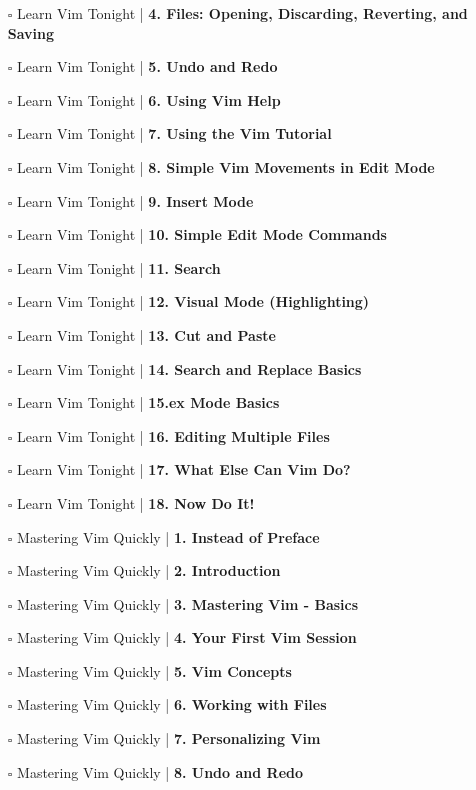 \documentclass[a4, landscape, 12pt]{article}
\newcommand{\checkbox}{$\square$}%
\begin{document}
\begin{itemize}
{}
\item [\checkbox]  Learn Vim Tonight | \textbf{ 4. Files: Opening, Discarding, Reverting, and Saving
}
\item [\checkbox]  Learn Vim Tonight | \textbf{ 5. Undo and Redo
}
\item [\checkbox]  Learn Vim Tonight | \textbf{ 6. Using Vim Help
}
\item [\checkbox]  Learn Vim Tonight | \textbf{ 7. Using the Vim Tutorial
}
\item [\checkbox]  Learn Vim Tonight | \textbf{ 8. Simple Vim Movements in Edit Mode
}
\item [\checkbox]  Learn Vim Tonight | \textbf{ 9. Insert Mode
}
\item [\checkbox]  Learn Vim Tonight | \textbf{ 10. Simple Edit Mode Commands
}
\item [\checkbox]  Learn Vim Tonight | \textbf{ 11. Search
}
\item [\checkbox]  Learn Vim Tonight | \textbf{ 12. Visual Mode (Highlighting)
}
\item [\checkbox]  Learn Vim Tonight | \textbf{ 13. Cut and Paste
}
\item [\checkbox]  Learn Vim Tonight | \textbf{ 14. Search and Replace Basics
}
\item [\checkbox]  Learn Vim Tonight | \textbf{ 15.ex Mode Basics
}
\item [\checkbox]  Learn Vim Tonight | \textbf{ 16. Editing Multiple Files
}
\item [\checkbox]  Learn Vim Tonight | \textbf{ 17. What Else Can Vim Do?
}
\item [\checkbox]  Learn Vim Tonight | \textbf{ 18.  Now Do It!
}
\item [\checkbox]  Mastering Vim Quickly | \textbf{ 1. Instead of Preface
}
\item [\checkbox]  Mastering Vim Quickly | \textbf{ 2. Introduction
}
\item [\checkbox]  Mastering Vim Quickly | \textbf{ 3. Mastering Vim - Basics
}
\item [\checkbox]  Mastering Vim Quickly | \textbf{ 4. Your First Vim Session
}
\item [\checkbox]  Mastering Vim Quickly | \textbf{ 5. Vim Concepts
}
\item [\checkbox]  Mastering Vim Quickly | \textbf{ 6. Working with Files
}
\item [\checkbox]  Mastering Vim Quickly | \textbf{ 7. Personalizing Vim
}
\item [\checkbox]  Mastering Vim Quickly | \textbf{ 8. Undo and Redo
}
\end{itemize}
\end{document}
